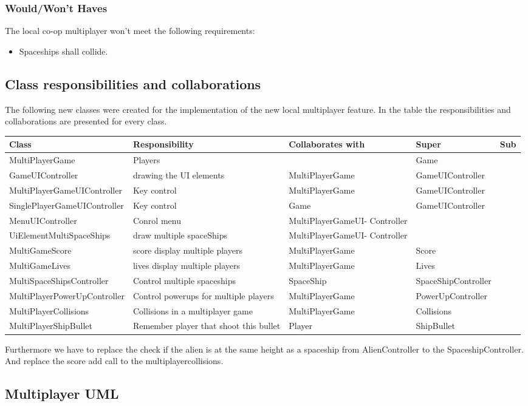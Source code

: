 \documentclass[10pt]{article}
\begin{document}
\subsubsection{Would/Won't Haves}
The local co-op multiplayer won't meet the following requirements:
\begin{itemize}
	\item Spaceships shall collide.
\end{itemize}
\newpage

\subsection{Class responsibilities and collaborations}


The following new classes were created for the implementation of the new local multiplayer feature.
In the table the responsibilities and collaborations are presented for every class.
\begin{center}
    \begin{tabular}{ | p{4.5cm} | p{3cm} | p{3cm} | p{3cm} | p{1cm} |}
  \hline
    Class & Responsibility & Collaborates with & Super & Sub \\ \hline
   MultiPlayerGame & Players  & & Game & \\ \hline
   GameUIController & drawing the UI elements & MultiPlayerGame  & GameUIController  & \\ \hline
 MultiPlayerGameUIController & Key control & MultiPlayerGame  & GameUIController  & \\ \hline
 SinglePlayerGameUIController & Key control & Game  & GameUIController  & \\ \hline
   MenuUIController& Conrol menu & MultiPlayerGameUI- Controller  &   &  \\ \hline
   UiElementMultiSpaceShips& draw multiple spaceShips & MultiPlayerGameUI- Controller  &  &  \\ \hline
 MultiGameScore & score display multiple players &  MultiPlayerGame  &  Score  & \\ \hline
 MultiGameLives &  lives display multiple players & MultiPlayerGame  & Lives  & \\ \hline
 MultiSpaceShipsController& Control multiple spaceships & SpaceShip  & SpaceShipController &  \\ \hline
 MultiPlayerPowerUpController& Control powerups for multiple players & MultiPlayerGame   & PowerUpController &  \\ \hline
 MultiPlayerCollisions & Collisions in a multiplayer game & MultiPlayerGame   & Collisions&  \\ \hline
 MultiPlayerShipBullet & Remember player that shoot this bullet & Player  & ShipBullet &  \\ \hline

    \end{tabular}
\end{center}

Furthermore we have to replace the check if the alien is at the same height as a spaceship from AlienController to the SpaceshipController. \newline
And replace the score add call to the multiplayercollisions.


\subsection{Multiplayer UML}
\end{document}
